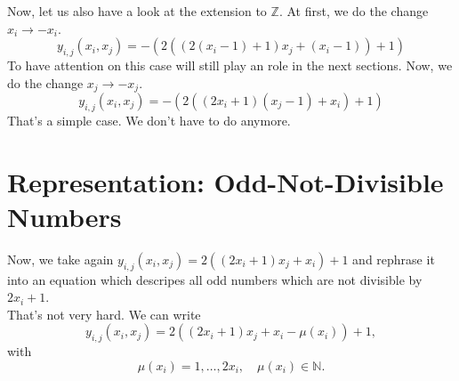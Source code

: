Now, let us also have a look at the extension to $\mathbb{Z}$. At first, we do the change $x_{i} \rightarrow -x_{i}$. 
\begin{equation}
	y_{i,j}\left(x_{i},x_{j}\right) = -\left(2\left(\left(2\left(x_{i} - 1\right) + 1\right)x_{j} + \left(x_{i} - 1\right)\right) + 1\right)
\label{eq:repodddivnumbers_negi}
\end{equation}
To have attention on this case will still play an role in the next sections. Now, we do the change $x_{j} \rightarrow -x_{j}$.
\begin{equation}
	y_{i,j}\left(x_{i},x_{j}\right) = -\left(2\left(\left(2x_{i} + 1\right)\left(x_{j} - 1\right) + x_{i}\right) + 1\right)
\label{eq:repodddivnumbers_negj}
\end{equation}
That's a simple case. We don't have to do anymore. 
\section{Representation: Odd-Not-Divisible Numbers}
\label{s:repoddnotdivnumbers}
Now, we take again $y_{i,j}\left(x_{i},x_{j}\right) = 2\left(\left(2x_{i} + 1\right)x_{j} + x_{i}\right) + 1$ and rephrase it into an equation which descripes all odd numbers which are not divisible by $2x_{i} + 1$. \\
That's not very hard. We can write
\begin{equation}
	y_{i,j}\left(x_{i},x_{j}\right) = 2\left(\left(2x_{i} + 1\right)x_{j} + x_{i} - \mu\left(x_{i}\right)\right) + 1,
\label{eq:repoddnotdivnumb}
\end{equation}
with
\begin{equation}
	\mu\left(x_{i}\right) = 1,\dots,2x_{i}, \quad \mu\left(x_{i}\right) \in \mathbb{N}.
\label{eq:defmu}
\end{equation}

